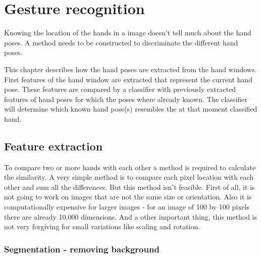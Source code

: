 
\chapter{Gesture recognition}
\label{ch:gestures}

Knowing the location of the hands in a image doesn't tell much about the hand poses. A method needs to be constructed to discriminate the different hand poses. 

This chapter describes how the hand poses are extracted from the hand windows. First features of the hand window are extracted that represent the current hand pose. These features are compared by a classifier with previously extracted features of hand poses for which the poses where already known. The classifier will determine which known hand pose(s) resembles the at that moment classified hand.


\section{Feature extraction}
To compare two or more hands with each other a method is required to calculate the similarity. A very simple method is to compare each pixel location with each other and sum all the differences. But this method isn't feasible. First of all, it is not going to work on images that are not the same size or orientation. Also it is computationally expensive for larger images - for an image of 100 by 100 pixels there are already 10.000 dimensions. And a other important thing, this method is not very forgiving for small variations like scaling and rotation.


\subsection*{Segmentation - removing background}

